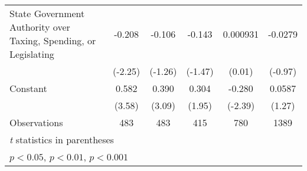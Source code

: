 {\begin{tabular*}{\linewidth}{@{\hskip\tabcolsep\extracolsep\fill}l*{5}{c}}
\addlinespace
State Government Authority over Taxing, Spending, or Legislating&   -0.208\sym{*}  &   -0.106         &   -0.143         & 0.000931         &  -0.0279         \\
                &  (-2.25)         &  (-1.26)         &  (-1.47)         &   (0.01)         &  (-0.97)         \\
\addlinespace
Constant        &    0.582\sym{***}&    0.390\sym{**} &    0.304         &   -0.280\sym{*}  &   0.0587         \\
                &   (3.58)         &   (3.09)         &   (1.95)         &  (-2.39)         &   (1.27)         \\
\midrule
Observations    &      483         &      483         &      415         &      780         &     1389         \\
\bottomrule
\multicolumn{6}{l}{\footnotesize \textit{t} statistics in parentheses}\\
\multicolumn{6}{l}{\footnotesize \sym{*} \(p<0.05\), \sym{**} \(p<0.01\), \sym{***} \(p<0.001\)}\\
\end{tabular*}
}
